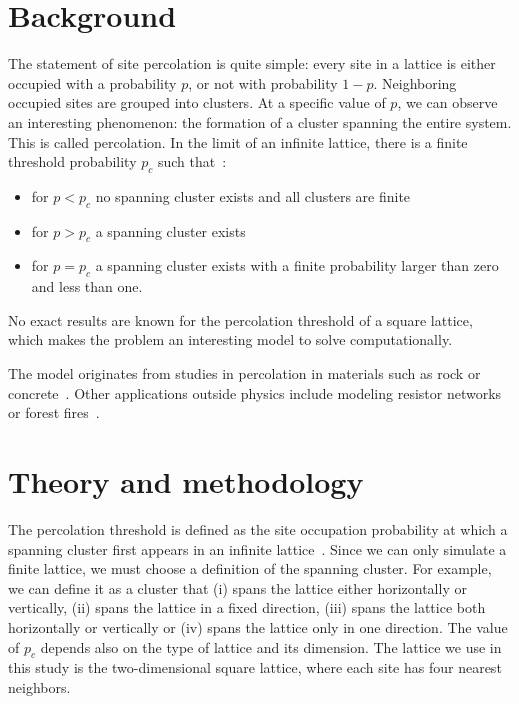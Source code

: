 

\section{Background}

The statement of site percolation is quite simple: every site in a lattice is either occupied with a probability $p$, or not with probability $1-p$. Neighboring occupied sites are grouped into clusters. At a specific value of $p$, we can observe an interesting phenomenon: the formation of a cluster spanning the entire system. This is called percolation. In the limit of an infinite lattice, there is a finite threshold probability $p_c$ such that~\cite{Gould_2006}:
\begin{itemize}
	\item for $p < p_c$ no spanning cluster exists and all clusters are finite
	\item for $p > p_c$ a spanning cluster exists
	\item for $p = p_c$ a spanning cluster exists with a finite probability larger than zero and less than one.
\end{itemize}
No exact results are known for the percolation threshold of a square lattice, which makes the problem an interesting model to solve computationally.

The model originates from studies in percolation in materials such as rock or concrete~\cite{Newman_2001}. Other applications outside physics include modeling resistor networks or forest fires~\cite{Newman_2001}. 


\section{Theory and methodology}
The percolation threshold is defined as the site occupation probability at which a spanning cluster first appears in an infinite lattice~\cite{Gould_2006}. Since we can only simulate a finite lattice, we must choose a definition of the spanning cluster. For example, we can define it as a cluster that (i) spans the lattice either horizontally or vertically, (ii) spans the lattice in a fixed direction, (iii) spans the lattice both horizontally or vertically or (iv) spans the lattice only in one direction. The value of $p_c$ depends also on the type of lattice and its dimension. The lattice we use in this study is the two-dimensional square lattice, where each site has four nearest neighbors.

